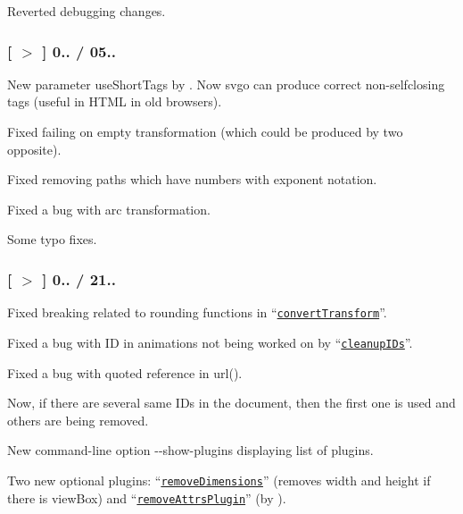 \begin{DoxyItemize}
\item Reverted debugging changes.
\end{DoxyItemize}

\subsubsection*{\mbox{[} \href{https://github.com/svg/svgo/tree/v0.5.4}{\tt $>$} \mbox{]} 0.. / 05..}


\begin{DoxyItemize}
\item New parameter {\ttfamily use\+Short\+Tags} by . Now svgo can produce correct non-\/selfclosing tags (useful in H\+T\+ML in old browsers).
\item Fixed failing on empty transformation (which could be produced by two opposite).
\item Fixed removing paths which have numbers with exponent notation.
\item Fixed a bug with arc transformation.
\item Some typo fixes.
\end{DoxyItemize}

\subsubsection*{\mbox{[} \href{https://github.com/svg/svgo/tree/v0.5.3}{\tt $>$} \mbox{]} 0.. / 21..}


\begin{DoxyItemize}
\item Fixed breaking related to rounding functions in “\href{https://github.com/svg/svgo/blob/master/plugins/convertTransform.js}{\tt convert\+Transform}”.
\item Fixed a bug with ID in animations not being worked on by “\href{https://github.com/svg/svgo/blob/master/plugins/cleanupIDs.js}{\tt cleanup\+I\+Ds}”.
\item Fixed a bug with quoted reference in {\ttfamily url()}.
\item Now, if there are several same I\+Ds in the document, then the first one is used and others are being removed.
\item New command-\/line option {\ttfamily -\/-\/show-\/plugins} displaying list of plugins.
\item Two new optional plugins\+: “\href{https://github.com/svg/svgo/blob/master/plugins/removeDimensions.js}{\tt remove\+Dimensions}” (removes {\ttfamily width} and {\ttfamily height} if there is {\ttfamily view\+Box}) and “\href{https://github.com/svg/svgo/blob/master/plugins/removeAttrs.js}{\tt remove\+Attrs\+Plugin}” (by ).
\end{DoxyItemize}

